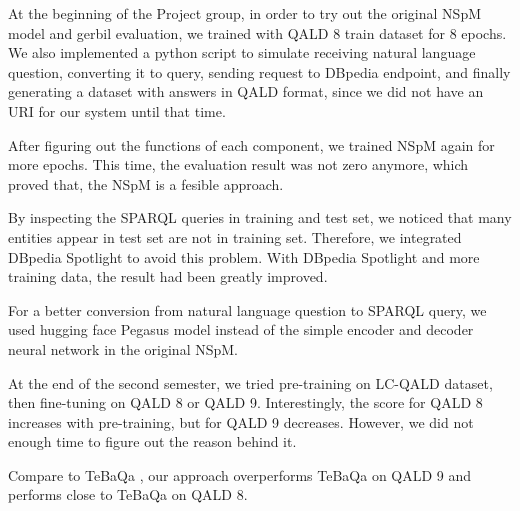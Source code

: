 At the beginning of the Project group,
in order to try out the original NSpM model and gerbil evaluation,
we trained with QALD 8 train dataset for 8 epochs. 
We also implemented a python script to simulate 
receiving natural language question, 
converting it to query,
sending request to DBpedia endpoint, 
and finally generating a dataset with answers in QALD format,
since we did not have an URI for our system until that time. 

After figuring out the functions of each component, 
we trained NSpM again for more epochs. 
This time, the evaluation result was not zero anymore, 
which proved that,
the NSpM is a fesible approach. 

By inspecting the SPARQL queries in training and test set, 
we noticed that
many entities appear in test set are not in training set. 
Therefore, we integrated DBpedia Spotlight to avoid this problem. 
With DBpedia Spotlight and more training data, 
the result had been greatly improved. 

For a better conversion from natural language question to SPARQL query, 
we used hugging face Pegasus model instead of the simple encoder and decoder neural network in the original NSpM.

At the end of the second semester, we tried pre-training on LC-QALD dataset, then fine-tuning on QALD 8 or QALD 9. 
Interestingly, the score for QALD 8 increases with pre-training, 
but for QALD 9 decreases. 
However, we did not enough time to figure out the reason behind it. 

Compare to TeBaQa \cite{DBLP:journals/corr/abs-2103-06752},
our approach overperforms TeBaQa on QALD 9 and performs close to TeBaQa on QALD 8.